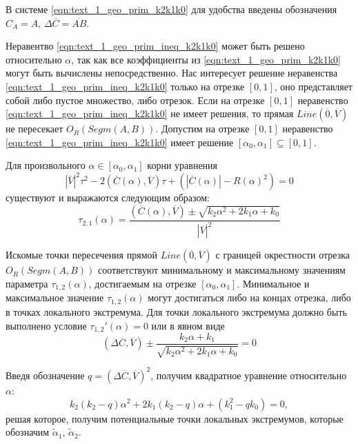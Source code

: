 В системе \eqref{eqn:text_1_geo_prim_k2k1k0} для удобства введены обозначения $C_A = A$, $\Delta \overline{C} = \overline{AB}$.

Неравентво \eqref{eqn:text_1_geo_prim_ineq_k2k1k0} может быть решено относительно $\alpha$, так как все коэффициенты из \eqref{eqn:text_1_geo_prim_k2k1k0} могут быть вычислены непосредственно.
Нас интересует решение неравенства \eqref{eqn:text_1_geo_prim_ineq_k2k1k0} только на отрезке $[0,1]$, оно представляет собой либо пустое множество, либо отрезок.
Если на отрезке $[0,1]$ неравенство \eqref{eqn:text_1_geo_prim_ineq_k2k1k0} не имеет решения, то прямая $Line(\overline{0}, \overline{V})$ не пересекает $O_R(Segm(A, B))$.
Допустим на отрезке $[0,1]$ неравенство \eqref{eqn:text_1_geo_prim_ineq_k2k1k0} имеет решение $[\alpha_0, \alpha_1] \subseteq [0, 1]$.
 
Для произвольного $\alpha \in [\alpha_0, \alpha_1]$ корни уравнения
\begin{equation}
	|\overline{V}|^2 \tau^2 - 2(\overline{C}(\alpha), \overline{V}) \tau + \left( |\overline{C}(\alpha)| - R(\alpha)^2 \right) = 0
\end{equation}
существуют и выражаются следующим образом:
\begin{equation}
	\tau_{2,1}(\alpha) = \frac{(\overline{C}(\alpha), \overline{V}) \pm \sqrt{k_2 \alpha^2 + 2 k_1 \alpha + k_0}}{|\overline{V}|^2}
\end{equation}

Искомые точки пересечения прямой $Line(\overline{0}, \overline{V})$ с границей окрестности отрезка $O_R(Segm(A, B))$ соответствуют минимальному и максимальному значениям параметра $\tau_{1,2}(\alpha)$, достигаемым на отрезке $[\alpha_0, \alpha_1]$.
Минимальное и максимальное значение $\tau_{1,2}(\alpha)$ могут достигаться либо на концах отрезка, либо в точках локального экстремума.
Для точки локального экстремума должно быть выполнено условие $\tau_{1,2}'(\alpha) = 0$ или в явном виде
\begin{equation}
	(\Delta \overline{C}, \overline{V}) \pm \frac{k_2 \alpha + k_1}{ \sqrt{k_2 \alpha^2 + 2 k_1 \alpha + k_0} } = 0
\end{equation}

Введя обозначение $q = (\Delta \overline{C}, \overline{V})^2$, получим квадратное уравнение относительно $\alpha$:
\begin{equation}
	k_2 (k_2 - q) \alpha^2 + 2 k_1 (k_2 - q) \alpha + (k_1^2 - q k_0) = 0,
\end{equation}
решая которое, получим потенциальные точки локальных экстремумов, которые обозначим $\tilde{\alpha}_1$, $\tilde{\alpha}_2$.

